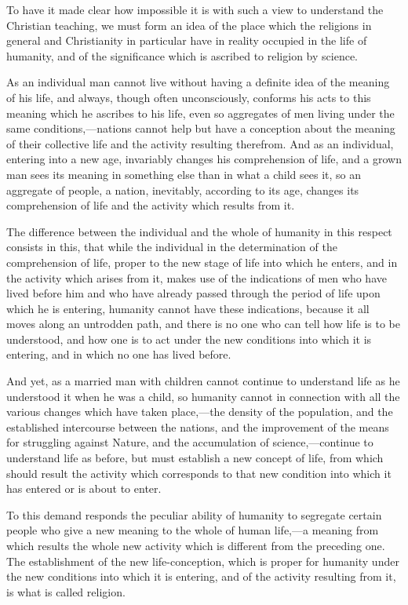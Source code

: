 \documentclass{book}
\begin{document}
To have it made clear how impossible it is with such a view to understand the Christian teaching, we must form an idea of the place which the religions in general and Christianity in particular have in reality occupied in the life of humanity, and of the significance which is ascribed to religion by science.

As an individual man cannot live without having a definite idea of the meaning of his life, and always, though often unconsciously, conforms his acts to this meaning which he ascribes to his life, even so aggregates of men living under the same conditions,—nations cannot help but have a conception about the meaning of their collective life and the activity resulting therefrom. And as an individual, entering into a new age, invariably changes his comprehension of life, and a grown man sees its meaning in something else than in what a child sees it, so an aggregate of people, a nation, inevitably, according to its age, changes its comprehension of life and the activity which results from it.

The difference between the individual and the whole of humanity in this respect consists in this, that while the individual in the determination of the comprehension of life, proper to the new stage of life into which he enters, and in the activity which arises from it, makes use of the indications of men who have lived before him and who have already passed through the period of life upon which he is entering, humanity cannot have these indications, because it all moves along an untrodden path, and there is no one who can tell how life is to be understood, and how one is to act under the new conditions into which it is entering, and in which no one has lived before.

And yet, as a married man with children cannot continue to understand life as he understood it when he was a child, so humanity cannot in connection with all the various changes which have taken place,—the density of the population, and the established intercourse between the nations, and the improvement of the means for struggling against Nature, and the accumulation of science,—continue to understand life as before, but must establish a new concept of life, from which should result the activity which corresponds to that new condition into which it has entered or is about to enter.

To this demand responds the peculiar ability of humanity to segregate certain people who give a new meaning to the whole of human life,—a meaning from which results the whole new activity which is different from the preceding one. The establishment of the new life-conception, which is proper for humanity under the new conditions into which it is entering, and of the activity resulting from it, is what is called religion.
\end{document}
